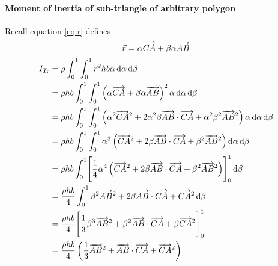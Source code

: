 \paragraph{Moment of inertia of sub-triangle of arbitrary polygon} Recall
equation \ref{eq:r} defines
$$ \vec r = \alpha \overrightarrow{CA} + \beta \alpha \overrightarrow{AB} $$
\begin{equation}
	\label{eq:subtriangle_arbitrary_moment_long}
	\begin{split}
		I_{T_i} &= \rho \int_0^1 \int_0^1 \vec r^2 hb \alpha  \diff \alpha \diff \beta\\
		&=\rho hb\int_0^1 \int_0^1 \left(\alpha \vv{CA} + \beta \alpha \vv{AB}\right)^2 \alpha  \diff \alpha \diff \beta\\
		&=\rho hb\int_0^1 \int_0^1 \left(\alpha^2 \vv{CA}^2 + 2 \alpha^2 \beta \vv{AB} \cdot \vv{CA} + \alpha^2 \beta^2 \vv{AB}^2\right) \alpha  \diff \alpha \diff \beta\\
		&=\rho hb\int_0^1 \int_0^1 \alpha^3 \left(\vv{CA}^2 + 2 \beta \vv{AB} \cdot \vv{CA} + \beta^2 \vv{AB}^2\right) \diff \alpha \diff \beta\\
		&=\rho hb\int_0^1 \Biggl[\frac{1}{4} \alpha^4 \left(\vv{CA}^2 + 2 \beta \vv{AB} \cdot \vv{CA} + \beta^2 \vv{AB}^2\right) \Biggr]_0^1\diff \beta\\
		&= \frac{\rho hb}{4}\int_0^1 \beta^2 \vv{AB}^2 + 2 \beta \vv{AB} \cdot \vv{CA} + \vv{CA}^2 \diff \beta\\
		&= \frac{\rho hb}{4} \Biggl[\frac{1}{3} \beta^3 \vv{AB}^2 + \beta^2 \vv{AB} \cdot \vv{CA} + \beta\vv{CA}^2 \Biggr]_0^1\\
		&= \frac{\rho hb}{4} \left(\frac{1}{3}\vv{AB}^2 + \vv{AB} \cdot \vv{CA} + \vv{CA}^2\right) \\
	\end{split}
\end{equation}
